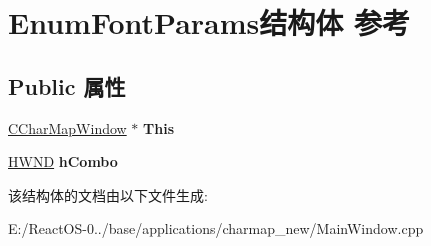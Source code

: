 \hypertarget{struct_enum_font_params}{}\section{Enum\+Font\+Params结构体 参考}
\label{struct_enum_font_params}
\subsection*{Public 属性}
\begin{DoxyCompactItemize}
\item 
\mbox{\label{struct_enum_font_params_aae0079f488dd7973dda442b5b6aa16f3}} 
\hyperlink{class_c_char_map_window}{C\+Char\+Map\+Window} $\ast$ {\bfseries This}
\item 
\mbox{\label{struct_enum_font_params_ab1e10ff8607676ba21aa355b5464b1a7}} 
\hyperlink{interfacevoid}{H\+W\+ND} {\bfseries h\+Combo}
\end{DoxyCompactItemize}


该结构体的文档由以下文件生成\+:\begin{DoxyCompactItemize}
\item 
E\+:/\+React\+O\+S-\/0../base/applications/charmap\+\_\+new/Main\+Window.\+cpp\end{DoxyCompactItemize}
